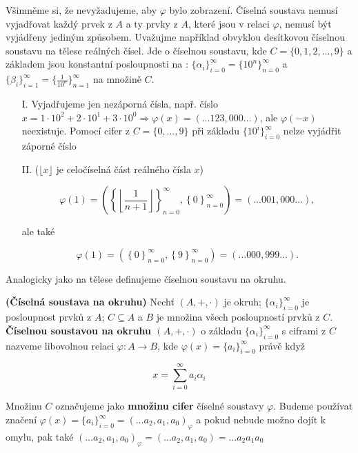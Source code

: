\documentclass[czech,bachelor,dept470,male]{diploma}
\newcommand{\poslbeta}{\{\beta_i\}_{i=1}^{\infty}}
\newcommand{\poslalpha}{\{\alpha_i\}_{i=0}^{\infty}}
\begin{document}
Všimněme si, že nevyžadujeme, aby $\varphi$ bylo zobrazení. Číselná soustava nemusí vyjadřovat každý prvek z $A$ a ty prvky z $A$, které jsou v relaci $\varphi$, nemusí být vyjádřeny jediným způsobem. Uvažujme například obvyklou desítkovou číselnou soustavu na tělese reálných čísel. Jde o číselnou soustavu, kde $C = \{0, 1, 2, \dots, 9\}$ a základem jsou konstantní posloupnosti na : $\poslalpha = \{10^n\}_{n = 0}^{\infty}$ a $\poslbeta = \{\frac{1}{10^n}\}_{n = 1}^{\infty}$ na množině $C$. 

\begin{enumerate}
	
	\item[I.] Vyjadřujeme jen nezáporná čísla, např. číslo $x = 1\cdot10^2 + 2\cdot10^1 + 3\cdot10^0 \Rightarrow \varphi(x) = (\dots123,000\dots)$, ale $\varphi(-x)$ neexistuje. Pomocí cifer z $C=\{0,\dots,9\}$ při základu $\{10^i\}_{i=0}^{\infty}$ nelze vyjádřit záporné číslo
	
	\item[II.] ($\lfloor x\rfloor$ je celočíselná část reálného čísla $x$)  
	
	$$\varphi(1) = \left(  \left\{ \left\lfloor\frac{1}{n+1} \right\rfloor \right\}_{n = 0}^{\infty} , \left\{ 0 \right\}_{n = 0}^{\infty} \right) = \left(\dots 001,000 \dots \right),$$
	
	ale také
	
	$$\varphi(1) = \left(  \left\{ 0 \right\}_{n = 0}^{\infty} , \left\{ 9 \right\}_{n = 0}^{\infty} \right) = \left(\dots 000,999 \dots \right).$$
	
\end{enumerate}
Analogicky jako na tělese definujeme číselnou soustavu na okruhu.


\begin{definition}\label{d3} \textbf{(Číselná soustava na okruhu)}
	Nechť $(A,+,\cdot)$ je okruh; $\poslalpha$ je posloupnost prvků z $A$; $C\subseteq A$ a $B$ je množina všech posloupností prvků z $C$.
	\textbf{Číselnou soustavou na okruhu $(A,+,\cdot)$} o základu $\poslalpha$ s ciframi z $C$ nazveme libovolnou relaci $\varphi : A \rightarrow B$, kde 	$\varphi(x)= \{a_{i}\}_{i=0}^{\infty}$ právě když
	
	$$x = \sum_{i=0}^{\infty} a_{i}\alpha_{i}$$
	
	Množinu $C$ označujeme jako \textbf{množinu cifer} číselné soustavy $\varphi$. Budeme používat značení $\varphi(x) = \{a_{i}\}_{i=0}^{\infty} = (\dots a_2,a_1,a_0)_{\varphi}$ a pokud nebude možno dojít k omylu, pak také $(\dots a_2,a_1,a_0)_{\varphi} = (\dots a_2,a_1,a_0) = \dots a_2a_1a_0$
\end{definition}
\end{document}
